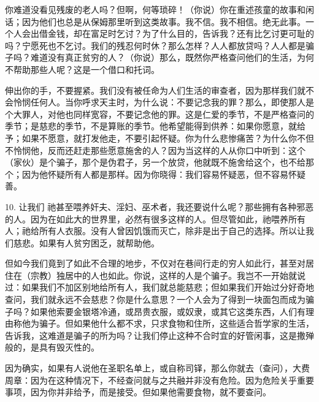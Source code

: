 你难道没看见残废的老人吗？但啊，何等琐碎！（你说）你在重述孩童的故事和闲话；因为他们也总是从保姆那里听到这类故事。我不信。我不相信。绝无此事。一个人会出借金钱，却在富足时乞讨？为了什么目的，告诉我？还有比乞讨更可耻的吗？宁愿死也不乞讨。我们的残忍何时休？那么怎样？人人都放贷吗？人人都是骗子吗？难道没有真正贫穷的人？（你说）那么，既然你严格查问他们的生活，为何不帮助那些人呢？这是一个借口和托词。\par

  伸出你的手，不要握紧。我们没有被任命为人们生活的审查者，因为那样我们就不会怜悯任何人。当你呼求天主时，为什么说：不要记念我的罪？那么，即使那人是个大罪人，对他也同样宽容，不要记念他的罪。这是仁爱的季节，不是严格查问的季节；是慈悲的季节，不是算账的季节。他希望能得到供养：如果你愿意，就给予；如果不愿意，就打发他走，不要引起怀疑。你为什么悲惨痛苦？为什么你不但不怜悯他，反而还赶走那些愿意施舍的人？因为当这样的人从你口中听到：这个（家伙）是个骗子，那个是伪君子，另一个放贷，他就既不施舍给这个，也不给那个；因为他怀疑所有人都是那样。因为你晓得：我们容易怀疑恶，但不容易怀疑善。\par

10. 让我们  祂甚至喂养奸夫、淫妇、巫术者，我还要说什么呢？那些拥有各种邪恶的人。因为在如此大的世界里，必然有很多这样的人。但尽管如此，祂喂养所有人；祂给所有人衣服。没有人曾因饥饿而灭亡，除非是出于自己的选择。所以让我们慈悲。如果有人贫穷困乏，就帮助他。\par

但如今我们竟到了如此不合理的地步，不仅对在巷间行走的穷人如此行，甚至对居住在（宗教）独居中的人也如此。你说，这样的人是个骗子。我岂不一开始就说过：如果我们不加区别地给所有人，我们就总能慈悲；但如果我们开始过分好奇地查问，我们就永远不会慈悲？你是什么意思？一个人会为了得到一块面包而成为骗子吗？如果他索要金银塔冷通，或昂贵衣服，或奴隶，或其它这类东西，人们有理由称他为骗子。但如果他什么都不求，只求食物和住所，这些适合哲学家的生活，告诉我，这难道是骗子的所为吗？让我们停止这种不合时宜的好管闲事，这是撒殚般的，是具有毁灭性的。\par

因为确实，如果有人说他在圣职名单上，或自称司铎，那么你就去（查问），大费周章：因为在这种情况下，不经查问就与之共融并非没有危险。因为危险关乎重要事项，因为你并非给予，而是接受。但如果他需要食物，就不要查问。\par

